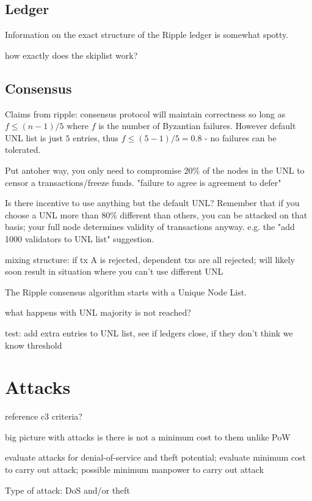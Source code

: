 \documentclass{article}
\begin{document}
\subsection{Ledger}

Information on the exact structure of the Ripple ledger is somewhat spotty.

how exactly does the skiplist work?


\subsection{Consensus}


Claims from ripple: consensus protocol will maintain correctness so long as $f
\le (n-1)/5$ where $f$ is the number of Byzantian failures. However default UNL
list is just $5$ entries, thus $f \le (5-1)/5 = 0.8$ - no failures can be
tolerated.

Put antoher way, you only need to compromise $20\%$ of the nodes in the UNL to
censor a transactions/freeze funds. "failure to agree is agreement to defer"


Is there incentive to use anything but the default UNL? Remember that if you
choose a UNL more than $80\%$ different than others, you can be attacked on
that basis; your full node determines validity of transactions anyway. e.g. the
"add 1000 validators to UNL list" suggestion.

mixing structure: if tx A is rejected, dependent txs are all rejected; will
likely soon result in situation where you can't use different UNL


The Ripple consensus algorithm starts with a Unique Node List. 


what happens with UNL majority is not reached?

test: add extra entries to UNL list, see if ledgers close, if they don't think we know threshold


\section{Attacks}

reference c3 criteria?

big picture with attacks is there is not a minimum cost to them unlike PoW

evaluate attacks for denial-of-service and theft potential; evaluate minimum
cost to carry out attack; possible minimum manpower to carry out attack


Type of attack: DoS and/or theft
\end{document}
